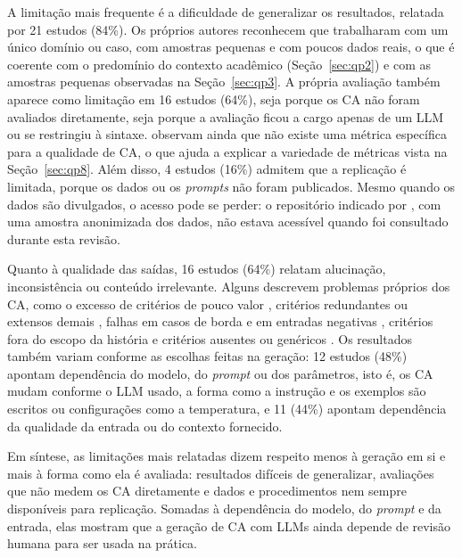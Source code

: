 A limitação mais frequente é a dificuldade de generalizar os resultados, relatada por 21 estudos (84\%). Os próprios autores reconhecem que trabalharam com um único domínio ou caso, com amostras pequenas e com poucos dados reais, o que é coerente com o predomínio do contexto acadêmico (Seção~\ref{sec:qp2}) e com as amostras pequenas observadas na Seção~\ref{sec:qp3}. A própria avaliação também aparece como limitação em 16 estudos (64\%), seja porque os CA não foram avaliados diretamente, seja porque a avaliação ficou a cargo apenas de um LLM ou se restringiu à sintaxe.  observam ainda que não existe uma métrica específica para a qualidade de CA, o que ajuda a explicar a variedade de métricas vista na Seção~\ref{sec:qp8}. Além disso, 4 estudos (16\%) admitem que a replicação é limitada, porque os dados ou os \textit{prompts} não foram publicados. Mesmo quando os dados são divulgados, o acesso pode se perder: o repositório indicado por , com uma amostra anonimizada dos dados, não estava acessível quando foi consultado durante esta revisão.

Quanto à qualidade das saídas, 16 estudos (64\%) relatam alucinação, inconsistência ou conteúdo irrelevante. Alguns descrevem problemas próprios dos CA, como o excesso de critérios de pouco valor \cite{rotar2025}, critérios redundantes ou extensos demais \cite{wang2025,li2024}, falhas em casos de borda e em entradas negativas \cite{wang2025,zyberaj2026}, critérios fora do escopo da história \cite{spijkman2025} e critérios ausentes ou genéricos \cite{brockenbrough2024}. Os resultados também variam conforme as escolhas feitas na geração: 12 estudos (48\%) apontam dependência do modelo, do \textit{prompt} ou dos parâmetros, isto é, os CA mudam conforme o LLM usado, a forma como a instrução e os exemplos são escritos ou configurações como a temperatura, e 11 (44\%) apontam dependência da qualidade da entrada ou do contexto fornecido.

Em síntese, as limitações mais relatadas dizem respeito menos à geração em si e mais à forma como ela é avaliada: resultados difíceis de generalizar, avaliações que não medem os CA diretamente e dados e procedimentos nem sempre disponíveis para replicação. Somadas à dependência do modelo, do \textit{prompt} e da entrada, elas mostram que a geração de CA com LLMs ainda depende de revisão humana para ser usada na prática.
